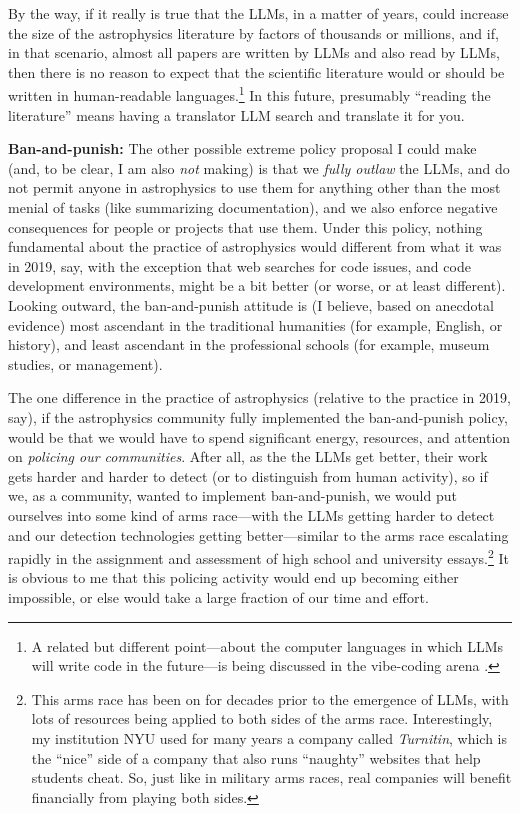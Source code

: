 \documentclass{article}
\newcommand{\paragraphskip}{\medskip}
\renewcommand{\paragraph}[1]{\par\paragraphskip\noindent\textbf{#1}}
\begin{document}
By the way, if it really is true that the LLMs, in a matter of years, could increase the size of the astrophysics literature by factors of thousands or millions,
and if, in that scenario, almost all papers are written by LLMs and also read by LLMs,
then there is no reason to expect that the scientific literature would or should be written in human-readable languages.\footnote{%
A related but different point---about the computer languages in which LLMs will write code in the future---is being discussed in the vibe-coding arena \cite{bloom}.}
In this future, presumably ``reading the literature'' means having a translator LLM search and translate it for you.

\paragraph{Ban-and-punish:}
The other possible extreme policy proposal I could make (and, to be clear, I am also \emph{not} making) is that we \emph{fully outlaw} the LLMs, and do not permit anyone in astrophysics to use them for anything other than the most menial of tasks (like summarizing documentation), and we also enforce negative consequences for people or projects that use them.
Under this policy, nothing fundamental about the practice of astrophysics would different from what it was in 2019, say, with the exception that web searches for code issues, and code development environments, might be a bit better (or worse, or at least different).
Looking outward, the ban-and-punish attitude is (I believe, based on anecdotal evidence) most ascendant in the traditional humanities (for example, English, or history), and least ascendant in the professional schools (for example, museum studies, or management).

The one difference in the practice of astrophysics (relative to the practice in 2019, say), if the astrophysics community fully implemented the ban-and-punish policy, would be that we would have to spend significant energy, resources, and attention on \emph{policing our communities}.
After all, as the the LLMs get better, their work gets harder and harder to detect (or to distinguish from human activity), so if we, as a community, wanted to implement ban-and-punish, we would put ourselves into some kind of arms race---with the LLMs getting harder to detect and our detection technologies getting better---similar to the arms race escalating rapidly in the assignment and assessment of high school and university essays.\footnote{%
This arms race has been on for decades prior to the emergence of LLMs,
with lots of resources being applied to both sides of the arms race.
Interestingly, my institution NYU used for many years a company called \textsl{Turnitin}, which is the ``nice'' side of a company that also runs ``naughty'' websites that help students cheat.
So, just like in military arms races, real companies will benefit financially from playing both sides.}
It is obvious to me that this policing activity would end up becoming either impossible, or else would take a large fraction of our time and effort.
\end{document}
